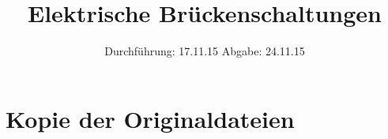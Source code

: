 

\subject{V 302}
\title{Elektrische Brückenschaltungen}
\date{
  Durchführung: 17.11.15
  \hspace{3em}
  Abgabe: 24.11.15
}



\maketitle
\thispagestyle{empty}
\tableofcontents
\newpage






\printbibliography

\nocite{anleitung}

\newpage

\appendix
\section{Kopie der Originaldateien}


